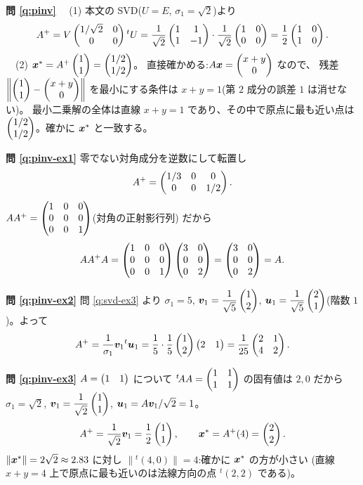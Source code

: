 \bigskip
\noindent\textbf{問 \ref{q:pinv}}\quad
　(1) 本文の SVD($U = E$, $\sigma_1 = \sqrt{2}$)より
\[
A^{+} = V\begin{pmatrix}1/\sqrt{2} & 0 \\ 0 & 0\end{pmatrix}{}^tU
= \frac{1}{\sqrt{2}}\begin{pmatrix}1 & 1 \\ 1 & -1\end{pmatrix}\cdot
\frac{1}{\sqrt{2}}\begin{pmatrix}1 & 0 \\ 0 & 0\end{pmatrix}
= \frac{1}{2}\begin{pmatrix}1 & 0 \\ 1 & 0\end{pmatrix}.
\]
　(2) $\bm{x}^{*} = A^{+}\begin{pmatrix}1 \\ 1\end{pmatrix} = \begin{pmatrix}1/2 \\ 1/2\end{pmatrix}$。
直接確かめる:$A\bm{x} = \begin{pmatrix}x + y \\ 0\end{pmatrix}$ なので、
残差 $\left\| \begin{pmatrix}1 \\ 1\end{pmatrix} - \begin{pmatrix}x+y \\ 0\end{pmatrix} \right\|$ を最小にする条件は
$x + y = 1$(第 $2$ 成分の誤差 $1$ は消せない)。
最小二乗解の全体は直線 $x + y = 1$ であり、その中で原点に最も近い点は
$\begin{pmatrix}1/2 \\ 1/2\end{pmatrix}$。確かに $\bm{x}^{*}$ と一致する。

\bigskip
\noindent\textbf{問 \ref{q:pinv-ex1}}\quad
零でない対角成分を逆数にして転置し
\[
A^{+} = \begin{pmatrix}1/3 & 0 & 0 \\ 0 & 0 & 1/2\end{pmatrix}.
\]
$AA^{+} = \begin{pmatrix}1 & 0 & 0 \\ 0 & 0 & 0 \\ 0 & 0 & 1\end{pmatrix}$(対角の正射影行列)
だから
\[
AA^{+}A = \begin{pmatrix}1 & 0 & 0 \\ 0 & 0 & 0 \\ 0 & 0 & 1\end{pmatrix}
\begin{pmatrix}3 & 0 \\ 0 & 0 \\ 0 & 2\end{pmatrix} = \begin{pmatrix}3 & 0 \\ 0 & 0 \\ 0 & 2\end{pmatrix} = A.
\]

\bigskip
\noindent\textbf{問 \ref{q:pinv-ex2}}\quad
問 \ref{q:svd-ex3} より $\sigma_1 = 5$,
$\bm{v}_1 = \dfrac{1}{\sqrt{5}}\begin{pmatrix}1 \\ 2\end{pmatrix}$,
$\bm{u}_1 = \dfrac{1}{\sqrt{5}}\begin{pmatrix}2 \\ 1\end{pmatrix}$(階数 $1$)。よって
\[
A^{+} = \frac{1}{\sigma_1}\bm{v}_1{}^t\bm{u}_1
= \frac{1}{5}\cdot\frac{1}{5}\begin{pmatrix}1 \\ 2\end{pmatrix}\begin{pmatrix}2 & 1\end{pmatrix}
= \frac{1}{25}\begin{pmatrix}2 & 1 \\ 4 & 2\end{pmatrix}.
\]

\bigskip
\noindent\textbf{問 \ref{q:pinv-ex3}}\quad
$A = \begin{pmatrix}1 & 1\end{pmatrix}$ について ${}^t\!AA = \begin{pmatrix}1 & 1 \\ 1 & 1\end{pmatrix}$ の固有値は
$2, 0$ だから $\sigma_1 = \sqrt{2}$,
$\bm{v}_1 = \dfrac{1}{\sqrt{2}}\begin{pmatrix}1 \\ 1\end{pmatrix}$,
$\bm{u}_1 = A\bm{v}_1/\sqrt{2} = 1$。
\[
A^{+} = \frac{1}{\sqrt{2}}\bm{v}_1 = \frac{1}{2}\begin{pmatrix}1 \\ 1\end{pmatrix}, \qquad
\bm{x}^* = A^{+}(4) = \begin{pmatrix}2 \\ 2\end{pmatrix}.
\]
$\|\bm{x}^*\| = 2\sqrt{2} \approx 2.83$ に対し
$\|{}^t(4, 0)\| = 4$:確かに $\bm{x}^*$ の方が小さい
(直線 $x + y = 4$ 上で原点に最も近いのは法線方向の点 ${}^t(2,2)$ である)。

